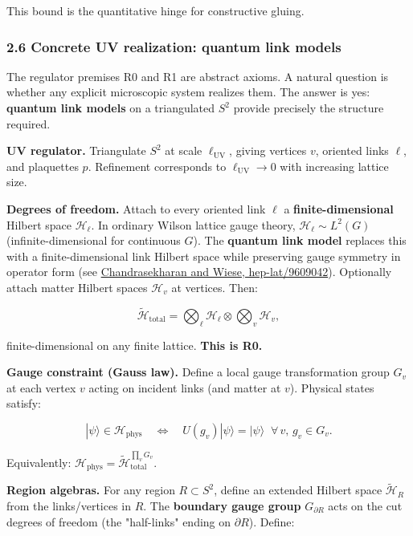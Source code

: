 This bound is the quantitative hinge for constructive gluing.

\subsubsection{2.6 Concrete UV realization: quantum link models}\label{26-concrete-uv-realization-quantum-link-models}

The regulator premises R0 and R1 are abstract axioms. A natural question is whether any explicit microscopic system realizes them. The answer is yes: \textbf{quantum link models} on a triangulated \(S^2\) provide precisely the structure required.

\textbf{UV regulator.} Triangulate \(S^2\) at scale \(\ell_{\mathrm{UV}}\), giving vertices \(v\), oriented links \(\ell\), and plaquettes \(p\). Refinement corresponds to \(\ell_{\mathrm{UV}} \to 0\) with increasing lattice size.

\textbf{Degrees of freedom.} Attach to every oriented link \(\ell\) a \textbf{finite-dimensional} Hilbert space \(\mathcal{H}_\ell\). In ordinary Wilson lattice gauge theory, \(\mathcal{H}_\ell \sim L^2(G)\) (infinite-dimensional for continuous \(G\)). The \textbf{quantum link model} replaces this with a finite-dimensional link Hilbert space while preserving gauge symmetry in operator form (see \href{https://arxiv.org/abs/hep-lat/9609042}{Chandrasekharan and Wiese, hep-lat/9609042}). Optionally attach matter Hilbert spaces \(\mathcal{H}_v\) at vertices. Then:

\[
\tilde{\mathcal{H}}_{\mathrm{total}} = \bigotimes_\ell \mathcal{H}_\ell \otimes \bigotimes_v \mathcal{H}_v,
\]

finite-dimensional on any finite lattice. \textbf{This is R0.}

\textbf{Gauge constraint (Gauss law).} Define a local gauge transformation group \(G_v\) at each vertex \(v\) acting on incident links (and matter at \(v\)). Physical states satisfy:

\[
|\psi\rangle \in \mathcal{H}_{\mathrm{phys}} \quad\Longleftrightarrow\quad U(g_v)|\psi\rangle = |\psi\rangle \;\;\forall\, v,\, g_v \in G_v.
\]

Equivalently: \(\mathcal{H}_{\mathrm{phys}} = \tilde{\mathcal{H}}_{\mathrm{total}}^{\prod_v G_v}\).

\textbf{Region algebras.} For any region \(R \subset S^2\), define an extended Hilbert space \(\tilde{\mathcal{H}}_R\) from the links/vertices in \(R\). The \textbf{boundary gauge group} \(G_{\partial R}\) acts on the cut degrees of freedom (the "half-links" ending on \(\partial R\)). Define:

